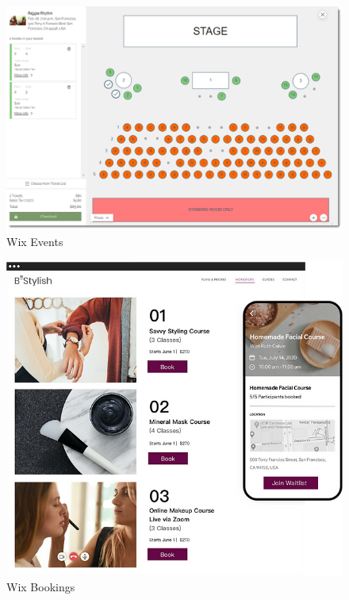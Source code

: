 \begin{figure}
    \centering
    \includegraphics[width=1.0\textwidth]{content/existing_reservation_systems/wix_seating_map.png}
    \caption[Wix Events]{Wix Events~\cite{wix}}
    \label{fig:wix_seating_map}
\end{figure}

\begin{figure}
    \centering
    \includegraphics[width=1.0\textwidth]{content/existing_reservation_systems/wix_bookings.png}
    \caption[Wix Bookings]{Wix Bookings~\cite{wix}}
    \label{fig:wix_bookings}
\end{figure}
